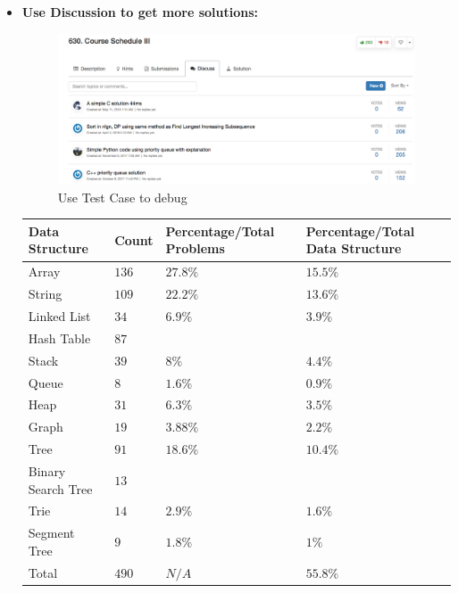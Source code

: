 \documentclass[../main.tex]{subfiles}
\begin{document}
\begin{itemize}
\item \textbf{Use Discussion to get more solutions:}
\begin{figure}[h]
    \centering
    \includegraphics[width=0.8\columnwidth]{fig/leetcode_discussion.png}
    \caption{Use Test Case to debug}
    \label{fig:test_case}
\end{figure}
\begin{table}[!ht]
\begin{small}
\centering
\noindent{}
 \noindent \begin{tabular}{|p{}|p{}| p{}| p{}|}
  \hline
 Data Structure & Count & Percentage/Total Problems & Percentage/Total Data Structure \\ \hline
Array  & $136$& $27.8\%$ & $15.5\%$\\
String   & $109$ & $22.2\%$ & $13.6\%$ \\ \hline

Linked List & $34$ & $6.9\%$ & $3.9\%$\\ 
Hash Table & $87$ \\ \hline

Stack & $39$ & $8\%$ & $4.4\%$\\ 
Queue & $8$ & $1.6\%$ & $0.9\%$\\ \hline 

Heap  & $31$ & $6.3\%$ & $3.5\%$\\
Graph & $19$ & $3.88\%$ & $2.2\%$ \\\hline

Tree  & $91$ & $18.6\%$ & $10.4\%$ \\ 
Binary Search Tree &$13$ \\
Trie & $14$ & $2.9\%$ & $1.6\%$\\
Segment Tree & $9$ & $1.8\%$ & $1\%$ \\\hline

Total & $490$ & $N/A$ & $55.8\%$\\ \hline
\end{tabular}
  \label{tab:msrc_precession}
  \end{small}
\end{table}


\end{itemize}
\end{document}
